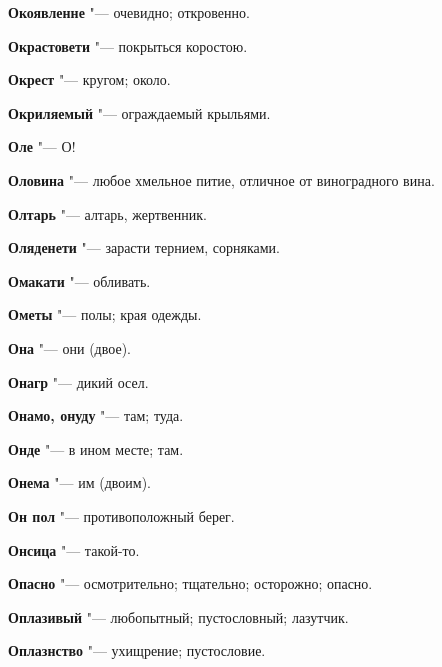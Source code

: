 \begin{mymulticols}{2}
\noindent\textbf{Окоявленне} "--- очевидно; откровенно. 




\noindent\textbf{Окрастовети} "--- покрыться коростою. 




\noindent\textbf{Окрест} "--- кругом; около. 




\noindent\textbf{Окриляемый} "--- ограждаемый крыльями. 




\noindent\textbf{Оле} "--- О! 




\noindent\textbf{Оловина} "--- любое хмельное питие, отличное от виноградного вина. 




\noindent\textbf{Олтарь} "--- алтарь, жертвенник. 




\noindent\textbf{Оляденети} "--- зарасти тернием, сорняками. 




\noindent\textbf{Омакати} "--- обливать. 




\noindent\textbf{Ометы} "--- полы; края одежды. 




\noindent\textbf{Она} "--- они (двое). 




\noindent\textbf{Онагр} "--- дикий осел. 




\noindent\textbf{Онамо, онуду} "--- там; туда. 




\noindent\textbf{Онде} "--- в ином месте; там. 




\noindent\textbf{Онема} "--- им (двоим). 




\noindent\textbf{Он пол} "--- противоположный берег. 




\noindent\textbf{Онсица} "--- такой-то. 




\noindent\textbf{Опасно} "--- осмотрительно; тщательно; осторожно; опасно. 




\noindent\textbf{Оплазивый} "--- любопытный; пустословный; лазутчик. 




\noindent\textbf{Оплазнство} "--- ухищрение; пустословие. 





\end{mymulticols}
